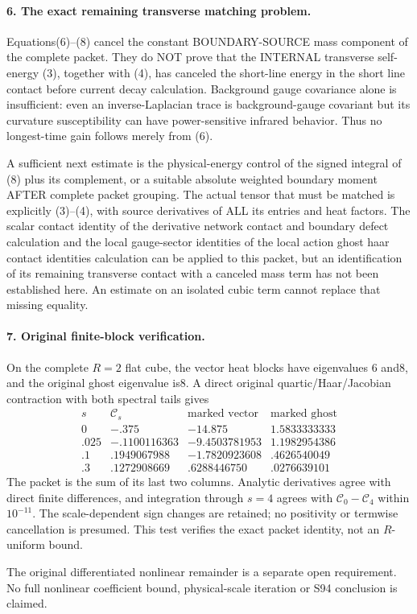 \documentclass[11pt]{article}
\begin{document}
\paragraph{6. The exact remaining transverse matching problem.}
Equations(6)--(8) cancel the constant BOUNDARY-SOURCE mass component of
the complete packet. They do NOT prove that the INTERNAL transverse
self-energy (3), together with (4), has canceled the short-line energy
in the short line contact before current decay calculation. Background gauge covariance alone is insufficient: even an
inverse-Laplacian trace is background-gauge covariant but its curvature
susceptibility can have power-sensitive infrared behavior. Thus no
longest-time gain follows merely from (6).

A sufficient next estimate is the physical-energy control of the signed
integral of (8) plus its complement, or a suitable absolute weighted
boundary moment AFTER complete packet grouping. The actual tensor that
must be matched is explicitly (3)--(4), with source derivatives of ALL
its entries and heat factors. The scalar contact identity of the derivative network contact and boundary defect calculation and
the local gauge-sector identities of the local action ghost haar contact identities calculation can be applied to this
packet, but an identification of its remaining transverse contact with
a canceled mass term has not been established here. An estimate on an
isolated cubic term cannot replace that missing equality.

\paragraph{7. Original finite-block verification.}
On the complete $R=2$ flat cube, the vector heat blocks have eigenvalues
6 and8, and the original ghost eigenvalue is8. A direct original
quartic/Haar/Jacobian contraction with both spectral tails gives
\[
\begin{array}{c|r|r|r}
s&\mathcal C_s&\text{marked vector}&\text{marked ghost}\\\hline
0&-.375&-14.875&1.5833333333\\
.025&-.1100116363&-9.4503781953&1.1982954386\\
.1&.1949067988&-1.7820923608&.4626540049\\
.3&.1272908669&.6288446750&.0276639101
\end{array}
\]
The packet is the sum of its last two columns. Analytic derivatives agree
with direct finite differences, and integration through $s=4$ agrees
with $\mathcal C_0-\mathcal C_4$ within $10^{-11}$.
The scale-dependent sign changes are retained; no positivity or
termwise cancellation is presumed. This test verifies the exact packet
identity, not an $R$-uniform bound.

The original differentiated nonlinear remainder is a separate open
requirement. No full nonlinear coefficient bound, physical-scale
iteration or S94 conclusion is claimed.
\end{document}

